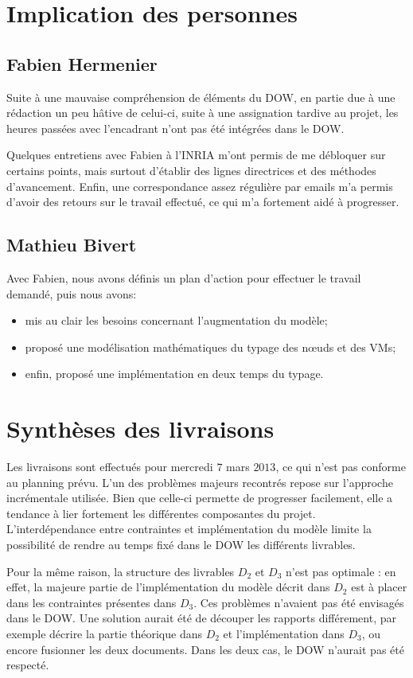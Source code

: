 \documentclass[a4paper]{article}
\begin{document}
\section{Implication des personnes}
\subsection{Fabien Hermenier}
Suite à une mauvaise compréhension de éléments du DOW, en partie due à
une rédaction un peu hâtive de celui-ci, suite à une assignation tardive
au projet, les heures passées avec l'encadrant n'ont pas été intégrées
dans le DOW.

Quelques entretiens avec Fabien à l'INRIA m'ont permis de me débloquer
sur certains points, mais surtout d'établir des lignes directrices et
des méthodes d'avancement. Enfin, une correspondance assez régulière
par emails m'a permis d'avoir des retours sur le travail effectué, ce
qui m'a fortement aidé à progresser.
\subsection{Mathieu Bivert}
Avec Fabien, nous avons définis un plan d'action pour effectuer le travail
demandé, puis nous avons:
\begin{itemize}
	\item mis au clair les besoins concernant l'augmentation du modèle;
	\item proposé une modélisation mathématiques du typage des nœuds et
		des VMs;
	\item enfin, proposé une implémentation en deux temps du typage.
\end{itemize}

\section{Synthèses des livraisons}
Les livraisons sont effectués pour mercredi $7$ mars $2013$, ce qui n'est
pas conforme au planning prévu. L'un des problèmes majeurs recontrés
repose sur l'approche incrémentale utilisée. Bien que celle-ci permette
de progresser facilement, elle a tendance à lier fortement les différentes
composantes du projet. L'interdépendance entre contraintes et implémentation
du modèle limite la possibilité de rendre au temps fixé dans le DOW les
différents livrables.

Pour la même raison, la structure des livrables $D_2$ et $D_3$ n'est pas
optimale : en effet, la majeure partie de l'implémentation du modèle décrit
dans $D_2$ est à placer dans les contraintes présentes dans $D_3$. Ces
problèmes n'avaient pas été envisagés dans le DOW. Une solution aurait été
de découper les rapports différement, par exemple décrire la partie théorique
dans $D_2$ et l'implémentation dans $D_3$, ou encore fusionner les deux
documents. Dans les deux cas, le DOW n'aurait pas été respecté.
\end{document}
